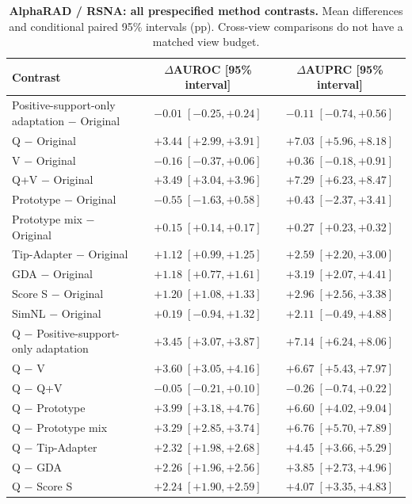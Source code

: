 \begin{table}[tp]
\centering
\caption{\textbf{AlphaRAD / RSNA: all prespecified method contrasts.} Mean differences and conditional paired 95\% intervals (pp). Cross-view comparisons do not have a matched view budget.}
\label{tab:supp-oldci-alpharad-rsna_pneumonia}
\footnotesize
\setlength{\tabcolsep}{4pt}
\begin{tabular*}{\textwidth}{@{\extracolsep{\fill}}lcc@{}}
\toprule
Contrast & $\Delta$AUROC [95\% interval] & $\Delta$AUPRC [95\% interval] \\
\midrule
Positive-support-only adaptation $-$ Original & $-0.01\;[-0.25,+0.24]$ & $-0.11\;[-0.74,+0.56]$ \\
Q $-$ Original & $+3.44\;[+2.99,+3.91]$ & $+7.03\;[+5.96,+8.18]$ \\
V $-$ Original & $-0.16\;[-0.37,+0.06]$ & $+0.36\;[-0.18,+0.91]$ \\
Q+V $-$ Original & $+3.49\;[+3.04,+3.96]$ & $+7.29\;[+6.23,+8.47]$ \\
Prototype $-$ Original & $-0.55\;[-1.63,+0.58]$ & $+0.43\;[-2.37,+3.41]$ \\
Prototype mix $-$ Original & $+0.15\;[+0.14,+0.17]$ & $+0.27\;[+0.23,+0.32]$ \\
Tip-Adapter $-$ Original & $+1.12\;[+0.99,+1.25]$ & $+2.59\;[+2.20,+3.00]$ \\
GDA $-$ Original & $+1.18\;[+0.77,+1.61]$ & $+3.19\;[+2.07,+4.41]$ \\
Score S $-$ Original & $+1.20\;[+1.08,+1.33]$ & $+2.96\;[+2.56,+3.38]$ \\
SimNL $-$ Original & $+0.19\;[-0.94,+1.32]$ & $+2.11\;[-0.49,+4.88]$ \\
Q $-$ Positive-support-only adaptation & $+3.45\;[+3.07,+3.87]$ & $+7.14\;[+6.24,+8.06]$ \\
Q $-$ V & $+3.60\;[+3.05,+4.16]$ & $+6.67\;[+5.43,+7.97]$ \\
Q $-$ Q+V & $-0.05\;[-0.21,+0.10]$ & $-0.26\;[-0.74,+0.22]$ \\
Q $-$ Prototype & $+3.99\;[+3.18,+4.76]$ & $+6.60\;[+4.02,+9.04]$ \\
Q $-$ Prototype mix & $+3.29\;[+2.85,+3.74]$ & $+6.76\;[+5.70,+7.89]$ \\
Q $-$ Tip-Adapter & $+2.32\;[+1.98,+2.68]$ & $+4.45\;[+3.66,+5.29]$ \\
Q $-$ GDA & $+2.26\;[+1.96,+2.56]$ & $+3.85\;[+2.73,+4.96]$ \\
Q $-$ Score S & $+2.24\;[+1.90,+2.59]$ & $+4.07\;[+3.35,+4.83]$ \\

\end{tabular*}
\end{table}

